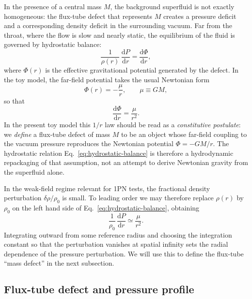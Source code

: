 \documentclass[11pt]{article}
\begin{document}
In the presence of a central mass $M$, the background superfluid is not
exactly homogeneous: the flux-tube defect that represents $M$ creates a
pressure deficit and a corresponding density deficit in the surrounding
vacuum.
Far from the throat, where the flow is slow and nearly static, the
equilibrium of the fluid is governed by hydrostatic balance:
\begin{equation}
  \frac{1}{\rho(r)}\,\frac{\mathrm{d}P}{\mathrm{d}r}
  = \frac{\mathrm{d}\Phi}{\mathrm{d}r},
  \label{eq:hydrostatic-balance}
\end{equation}
where $\Phi(r)$ is the effective gravitational potential generated by the
defect.
In the toy model, the far-field potential takes the usual Newtonian form
\begin{equation}
  \Phi(r) = -\frac{\mu}{r},
  \qquad
  \mu \equiv GM,
\end{equation}
so that
\begin{equation}
  \frac{\mathrm{d}\Phi}{\mathrm{d}r}
  = \frac{\mu}{r^2}.
\end{equation}
In the present toy model this $1/r$ law should be read as a
\emph{constitutive postulate}: we \emph{define} a flux-tube defect of mass
$M$ to be an object whose far-field coupling to the vacuum pressure
reproduces the Newtonian potential $\Phi = -GM/r$.
The hydrostatic relation Eq.~\eqref{eq:hydrostatic-balance} is therefore a
hydrodynamic repackaging of that assumption, not an attempt to derive
Newtonian gravity from the superfluid alone.

In the weak-field regime relevant for 1PN tests, the fractional density
perturbation $\delta\rho/\rho_0$ is small.
To leading order we may therefore replace $\rho(r)$ by $\rho_0$ on the left
hand side of Eq.~\eqref{eq:hydrostatic-balance}, obtaining
\begin{equation}
  \frac{1}{\rho_0}\,\frac{\mathrm{d}P}{\mathrm{d}r}
  \simeq \frac{\mu}{r^2}.
  \label{eq:hydrostatic-linear}
\end{equation}
Integrating outward from some reference radius and choosing the integration
constant so that the perturbation vanishes at spatial infinity
sets the radial dependence of the pressure perturbation.
We will use this to define the flux-tube ``mass defect'' in the next
subsection.


\subsection{Flux-tube defect and pressure profile}
\label{subsec:flux-tube}
\end{document}

